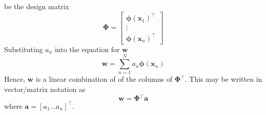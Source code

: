 \documentclass[12pt]{article}
\newcommand{\w}{\mathbf{w}}
\newcommand{\aVec}{\mathbf{a}}
\newcommand{\sumN}{\sum \limits_{n=1}^N}
\newcommand{\phiXOne}{\mathbf{\phi}\left(\mathbf{x}_1\right)}
\newcommand{\phiXn}{\mathbf{\phi}\left(\mathbf{x}_n\right)}
\newcommand{\PhiMat}{\mathbf{\Phi}}
\begin{document}
be the design matrix
%
\begin{equation*}
  \PhiMat{} =
  \left[\begin{matrix}
    \phiXOne^\top\\
    \vdots\\
    \phiXn^\top
  \end{matrix}\right]
\end{equation*}
%
Substituting $a_n$ into the equation for $\w{}$
%
\begin{equation*}
  \w{} = \sumN{}a_n\phiXn{}
\end{equation*}
%
Hence, $\w{}$ is a linear combination of of the columns of $\PhiMat{}^\top$.
This may be written in vector/matrix notation as
%
\begin{equation*}
  \w{} = \PhiMat{}^\top\aVec{}
\end{equation*}
%
where $\aVec{} = \left[a_1 \hdots a_n\right]^\top$.
\end{document}
